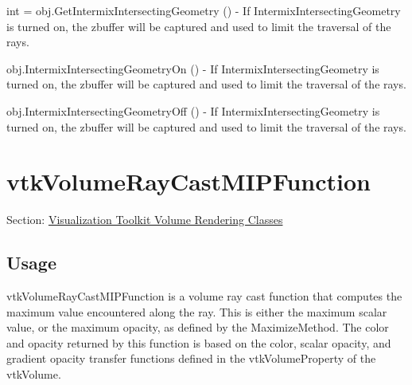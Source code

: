 \begin{DoxyItemize}
\item {\ttfamily int = obj.\-Get\-Intermix\-Intersecting\-Geometry ()} -\/ If Intermix\-Intersecting\-Geometry is turned on, the zbuffer will be captured and used to limit the traversal of the rays.  
\item {\ttfamily obj.\-Intermix\-Intersecting\-Geometry\-On ()} -\/ If Intermix\-Intersecting\-Geometry is turned on, the zbuffer will be captured and used to limit the traversal of the rays.  
\item {\ttfamily obj.\-Intermix\-Intersecting\-Geometry\-Off ()} -\/ If Intermix\-Intersecting\-Geometry is turned on, the zbuffer will be captured and used to limit the traversal of the rays.  
\end{DoxyItemize}\hypertarget{vtkvolumerendering_vtkvolumeraycastmipfunction}{}\section{vtk\-Volume\-Ray\-Cast\-M\-I\-P\-Function}\label{vtkvolumerendering_vtkvolumeraycastmipfunction}
Section\-: \hyperlink{sec_vtkvolumerendering}{Visualization Toolkit Volume Rendering Classes} \hypertarget{vtkwidgets_vtkxyplotwidget_Usage}{}\subsection{Usage}\label{vtkwidgets_vtkxyplotwidget_Usage}
vtk\-Volume\-Ray\-Cast\-M\-I\-P\-Function is a volume ray cast function that computes the maximum value encountered along the ray. This is either the maximum scalar value, or the maximum opacity, as defined by the Maximize\-Method. The color and opacity returned by this function is based on the color, scalar opacity, and gradient opacity transfer functions defined in the vtk\-Volume\-Property of the vtk\-Volume.


